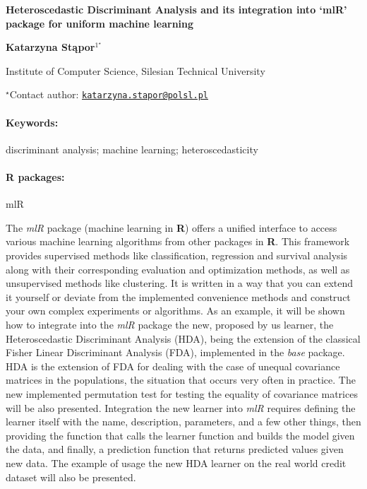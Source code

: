 \documentclass[11pt, a4paper]{article}
\renewcommand{\title}[1]{\begin{center}{\bf \LARGE #1}\end{center}}
\newcommand{\keywords}{\paragraph{Keywords:}}
\newcommand{\packages}{\paragraph{R packages:}}
\begin{document}
\pagestyle{empty}

\title{Heteroscedastic Discriminant Analysis and its integration into `mlR'
package for uniform machine learning}

\begin{center}
  {\bf Katarzyna Stąpor$^{1^\star}$}
\end{center}

\vskip 0.3cm

\begin{affiliations}
\begin{enumerate}
\begin{minipage}{0.915\textwidth}
\centering
\item Institute of Computer Science, Silesian Technical University \\[-2pt]
\end{minipage}
\end{enumerate}
$^\star$Contact author: \href{mailto:katarzyna.stapor@polsl.pl}{\nolinkurl{katarzyna.stapor@polsl.pl}}\\
\end{affiliations}

\vskip 0.5cm

\begin{minipage}{0.915\textwidth}
\keywords discriminant analysis; machine learning; heteroscedasticity
\packages mlR
\end{minipage}

\vskip 0.8cm

The \emph{mlR} package (machine learning in \textbf{R}) offers a unified
interface to access various machine learning algorithms from other
packages in \textbf{R}. This framework provides supervised methods like
classification, regression and survival analysis along with their
corresponding evaluation and optimization methods, as well as
unsupervised methods like clustering. It is written in a way that you
can extend it yourself or deviate from the implemented convenience
methods and construct your own complex experiments or algorithms. As an
example, it will be shown how to integrate into the \emph{mlR} package
the new, proposed by us learner, the Heteroscedastic Discriminant
Analysis (HDA), being the extension of the classical Fisher Linear
Discriminant Analysis (FDA), implemented in the \emph{base} package. HDA
is the extension of FDA for dealing with the case of unequal covariance
matrices in the populations, the situation that occurs very often in
practice. The new implemented permutation test for testing the equality
of covariance matrices will be also presented. Integration the new
learner into \emph{mlR} requires defining the learner itself with the
name, description, parameters, and a few other things, then providing
the function that calls the learner function and builds the model given
the data, and finally, a prediction function that returns predicted
values given new data. The example of usage the new HDA learner on the
real world credit dataset will also be presented.
\end{document}
